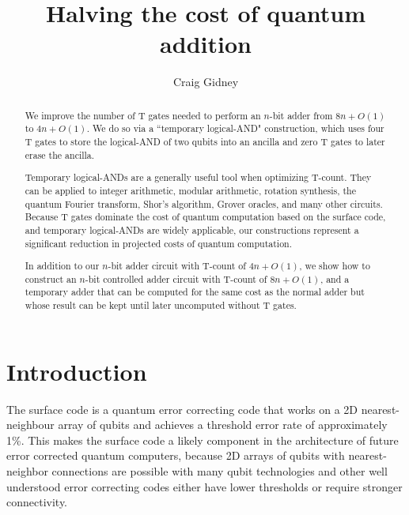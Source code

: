 \documentclass[twocolumn]{revtex4-1}
\begin{document}
\title{Halving the cost of quantum addition}
\author{Craig Gidney}

\begin{abstract}
We improve the number of T gates needed to perform an $n$-bit adder from $8n + O(1)$ \citep{Amy2013, Cuccaro2004, AustinDiscussionsAndEmails2017} to $4n + O(1)$.
We do so via a ``temporary logical-AND" construction, which uses four T gates to store the logical-AND of two qubits into an ancilla and zero T gates to later erase the ancilla.

Temporary logical-ANDs are a generally useful tool when optimizing T-count.
They can be applied to integer arithmetic, modular arithmetic, rotation synthesis, the quantum Fourier transform, Shor's algorithm, Grover oracles, and many other circuits.
Because T gates dominate the cost of quantum computation based on the surface code, and temporary logical-ANDs are widely applicable, our constructions represent a significant reduction in projected costs of quantum computation.

In addition to our $n$-bit adder circuit with T-count of $4n + O(1)$, we show how to construct an $n$-bit controlled adder circuit with T-count of $8n + O(1)$, and a temporary adder that can be computed for the same cost as the normal adder but whose result can be kept until later uncomputed without T gates.
\end{abstract}

\maketitle

\section{Introduction}
\label{sec:introduction}

The surface code \citep{Brav98,Denn02,Raus07,Raus07d,Fowler2012} is a quantum error correcting code that works on a 2D nearest-neighbour array of qubits and achieves a threshold error rate of approximately 1\%.
This makes the surface code a likely component in the architecture of future error corrected quantum computers, because 2D arrays of qubits with nearest-neighbor connections are possible with many qubit technologies \citep{Schl11,Bare13,Gamb17,Leik17,Laht17} and other well understood error correcting codes either have lower thresholds or require stronger connectivity.
\end{document}

